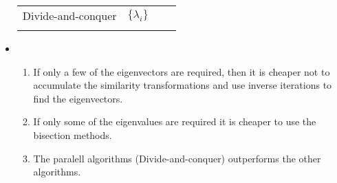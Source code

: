 \documentclass[a4paper,8pt]{beamer} %
\begin{document}
\begin{frame}
\begin{itemize}
\begin{table}
\begin{Tiny}
\begin{tabular}{llll}
							Divide-and-conquer 			& $\{\lambda_i\}$ 	&  & \\
							\\
							\hline
							\hline
						\end{tabular}
					\end{Tiny}
				\end{table}
			\item 
				\begin{enumerate}
					\item If only a few of the eigenvectors are required, then it is cheaper not to accumulate the similarity 
						transformations and use inverse iterations to find the eigenvectors. 
					\item If only some of the eigenvalues are required it is cheaper to use the bisection methods.
					\item The paralell algorithms (Divide-and-conquer) outperforms the other algorithms. 
				\end{enumerate}
		\end{itemize}
\end{frame}%
\end{document}
